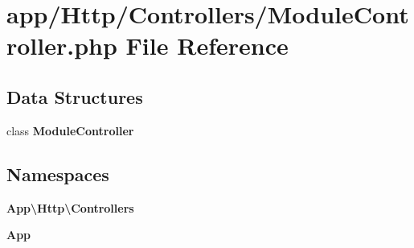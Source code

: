 \section{app/\+Http/\+Controllers/\+Module\+Controller.php File Reference}
\label{_module_controller_8php}
\subsection*{Data Structures}
\begin{DoxyCompactItemize}
\item 
class {\bf Module\+Controller}
\end{DoxyCompactItemize}
\subsection*{Namespaces}
\begin{DoxyCompactItemize}
\item 
 {\bf App\textbackslash{}\+Http\textbackslash{}\+Controllers}
\item 
 {\bf App}
\end{DoxyCompactItemize}
